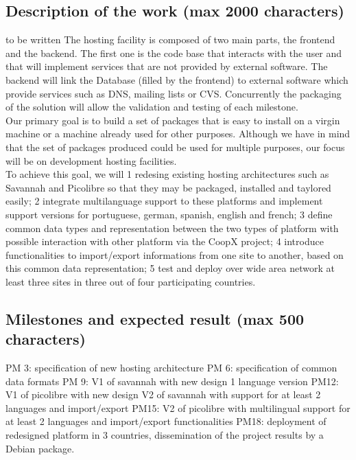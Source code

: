 \documentclass[a4paper,11pt]{report}
\begin{document}
\subsection*{Description of the work (max 2000 characters)} to be written
The hosting facility is composed of two main parts, the frontend and the
backend. The first one is the code base that interacts with the user and that
will implement services that are not provided by external software. The backend
will link the Database (filled by the frontend) to external software which
provide services such as DNS, mailing lists or CVS. Concurrently the packaging
of the solution will allow the validation and testing of each milestone.\\
Our primary goal is to build a set of packages that is easy to
install on a virgin machine or a machine already used for other
purposes. 
Although we have in mind that the set of packages produced could be used for
multiple purposes, our focus will be on development hosting facilities. \\

To achieve this goal, we will 
1 redesing existing hosting architectures such as Savannah and Picolibre 
  so that they may be packaged, installed and taylored easily; 
2 integrate multilanguage support to these platforms and implement support
  versions for portuguese, german, spanish, english and french;
3 define common data types and representation between the two types of
  platform with possible interaction with other platform via the CoopX project;
4 introduce functionalities to import/export informations from one site to
  another, based on this common data representation;
5 test and deploy over wide area network at least three sites in three out
	of four participating countries.
\subsection*{Milestones and expected result (max 500 characters)}
PM 3: specification of new hosting architecture
PM 6: specification of common data formats
PM 9: V1 of savannah with new design 1 language version
PM12: V1 of picolibre with new design
      V2 of savannah with support for at least 2 languages and import/export
PM15: V2 of picolibre with multilingual support for at least 2 languages and
      import/export functionalities
PM18: deployment of redesigned platform in 3 countries, 
      dissemination of the project results by a Debian package.
\end{document}
